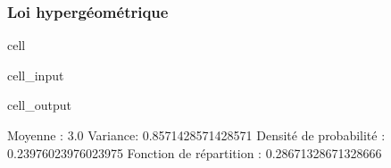 \documentclass[letterpaper,10pt,english]{jupyterBook}
\begin{document}
\subsubsection{Loi hypergéométrique}
\label{\detokenize{elemstats:loi-hypergeometrique}}
\begin{sphinxuseclass}{cell}\begin{sphinxVerbatimInput}

\begin{sphinxuseclass}{cell_input}
\begin{sphinxVerbatim}[commandchars=\\\{\}]
   

   
   
   
   

   
   
    
    
\end{sphinxVerbatim}

\end{sphinxuseclass}\end{sphinxVerbatimInput}
\begin{sphinxVerbatimOutput}

\begin{sphinxuseclass}{cell_output}
\begin{sphinxVerbatim}[commandchars=\\\{\}]
Moyenne :  3.0
Variance:  0.8571428571428571
Densité de probabilité :  0.23976023976023975
Fonction de répartition :  0.28671328671328666
\end{sphinxVerbatim}

\end{sphinxuseclass}\end{sphinxVerbatimOutput}

\end{sphinxuseclass}
\end{document}
